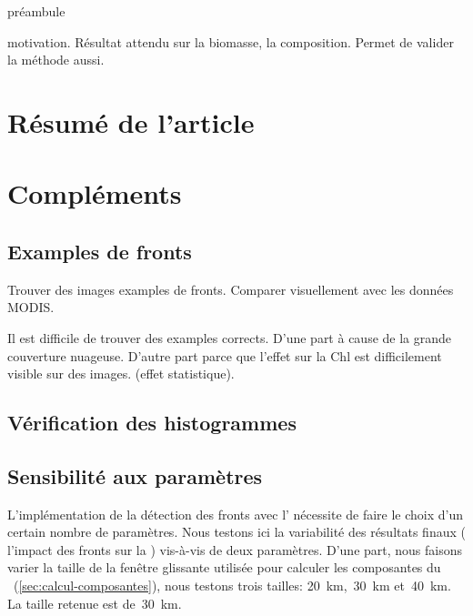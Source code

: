 
\label{chp:res-chl}
\graphicspath{{resources/res_chl}}

\minitoc%
\clearpage

préambule

motivation.
Résultat attendu sur la biomasse, la composition.
Permet de valider la méthode aussi.

\section{Résumé de l'article}
\label{sec:resume-article}

\insertArticle{}

\section{Compléments}
\label{sec:complements-chl}
\suppressfloats[t]

\subsection{Examples de fronts}
\label{sec:examples-fronts}

Trouver des images examples de fronts.
Comparer visuellement avec les données MODIS\@.

Il est difficile de trouver des examples corrects.
D'une part à cause de la grande couverture nuageuse.
D'autre part parce que l'effet sur la Chl est difficilement visible sur des images. (effet statistique).

\subsection{Vérification des histogrammes}

\subsection{Sensibilité aux paramètres}
\label{sec:sensibilite-parametres}

L'implémentation de la détection des fronts avec l' nécessite de faire le choix d'un certain nombre de paramètres. Nous testons ici la variabilité des résultats finaux ( l'impact des fronts sur la ) vis-à-vis de deux paramètres.
D'une part, nous faisons varier la taille de la fenêtre glissante utilisée pour calculer les composantes du ~(\cref{sec:calcul-composantes}), nous testons trois tailles: \qty{20}{\km},~\qty{30}{\km} et~\qty{40}{\km}. La taille retenue est de~\qty{30}{\km}.


